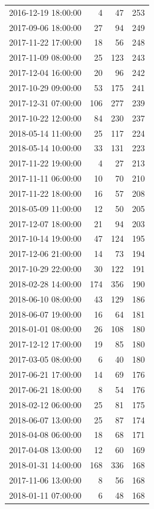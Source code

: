 \begin{tabular}{lrrr}
2016-12-19 18:00:00 & 4 & 47 & 253 \\
2017-09-06 18:00:00 & 27 & 94 & 249 \\
2017-11-22 17:00:00 & 18 & 56 & 248 \\
2017-11-09 08:00:00 & 25 & 123 & 243 \\
2017-12-04 16:00:00 & 20 & 96 & 242 \\
2017-10-29 09:00:00 & 53 & 175 & 241 \\
2017-12-31 07:00:00 & 106 & 277 & 239 \\
2017-10-22 12:00:00 & 84 & 230 & 237 \\
2018-05-14 11:00:00 & 25 & 117 & 224 \\
2018-05-14 10:00:00 & 33 & 131 & 223 \\
2017-11-22 19:00:00 & 4 & 27 & 213 \\
2017-11-11 06:00:00 & 10 & 70 & 210 \\
2017-11-22 18:00:00 & 16 & 57 & 208 \\
2018-05-09 11:00:00 & 12 & 50 & 205 \\
2017-12-07 18:00:00 & 21 & 94 & 203 \\
2017-10-14 19:00:00 & 47 & 124 & 195 \\
2017-12-06 21:00:00 & 14 & 73 & 194 \\
2017-10-29 22:00:00 & 30 & 122 & 191 \\
2018-02-28 14:00:00 & 174 & 356 & 190 \\
2018-06-10 08:00:00 & 43 & 129 & 186 \\
2018-06-07 19:00:00 & 16 & 64 & 181 \\
2018-01-01 08:00:00 & 26 & 108 & 180 \\
2017-12-12 17:00:00 & 19 & 85 & 180 \\
2017-03-05 08:00:00 & 6 & 40 & 180 \\
2017-06-21 17:00:00 & 14 & 69 & 176 \\
2017-06-21 18:00:00 & 8 & 54 & 176 \\
2018-02-12 06:00:00 & 25 & 81 & 175 \\
2018-06-07 13:00:00 & 25 & 87 & 174 \\
2018-04-08 06:00:00 & 18 & 68 & 171 \\
2017-04-08 13:00:00 & 12 & 60 & 169 \\
2018-01-31 14:00:00 & 168 & 336 & 168 \\
2017-11-06 13:00:00 & 8 & 56 & 168 \\
2018-01-11 07:00:00 & 6 & 48 & 168 \\

\end{tabular}
